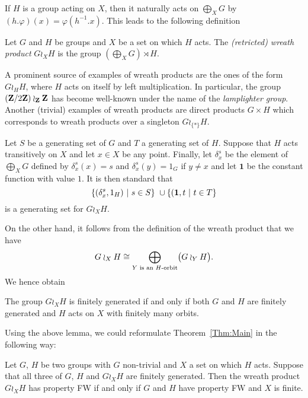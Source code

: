 If $H$ is a group acting on $X$, then it naturally acts on $\bigoplus_XG$
by $(h.\varphi)(x)=\varphi(h^{-1}.x)$.
This leads to the following definition
\begin{defn}\label{Def:WreathProd}
Let $G$ and $H$ be groups and $X$ be a set on which $H$ acts.
The \emph{(retricted) wreath product} $G\wr_XH$ is the group $(\bigoplus_XG)\rtimes H$.
\end{defn}
A prominent  source of examples of wreath products are the ones of the form $G\wr_HH$, where $H$ acts on itself by left multiplication.
In particular, the group $(\mathbf{Z}/2\mathbf{Z})\wr_{\mathbf{Z}}\mathbf{Z}$ has become well-known under the name of the \emph{lamplighter group}.
Another (trivial) examples of wreath products are direct products $G\times H$ which corresponds to wreath products over a singleton $G\wr_{\{*\}}H$.

Let $S$ be a generating set of $G$ and $T$ a generating set of $H$.
Suppose that $H$ acts transitively on $X$ and let $x\in X$ be any point.
Finally, let $\delta_x^s$ be the element of $\bigoplus_XG$ defined by $\delta_x^s(x)=s$ and $\delta_x^s(y)=1_G$ if $y\neq x$ and let $\mathbf 1$ be the constant function with value $1$.
It is then standard that 
\[
	\setst{(\delta_x^s,1_H)}{s \in S} \cup \setst{(\mathbf 1,t}{t \in T}
\]
is a generating set for $G\wr_XH$.

On the other hand, it follows from the definition of the wreath product that we have
\[
	G\wr_XH\cong\bigoplus_{Y\textnormal{ is an $H$-orbit}}\bigl(G\wr_YH\bigr).
\]
We hence obtain
%
%
\begin{lem}
The group $G\wr_XH$ is finitely generated if and only if both $G$ and $H$ are finitely generated and $H$ acts on $X$ with finitely many orbits.
\end{lem}
%
%
Using the above lemma, we could reformulate Theorem~\ref{Thm:Main} in the following way:
%
%
\begin{prop}
Let $G$, $H$ be two groups with $G$ non-trivial and $X$ a set on which $H$ acts. Suppose that all three of $G$, $H$ and $G\wr_XH$ are finitely generated. Then the wreath product $G\wr_XH$ has property FW if and only if $G$ and $H$ have property FW and $X$ is finite.
\end{prop}